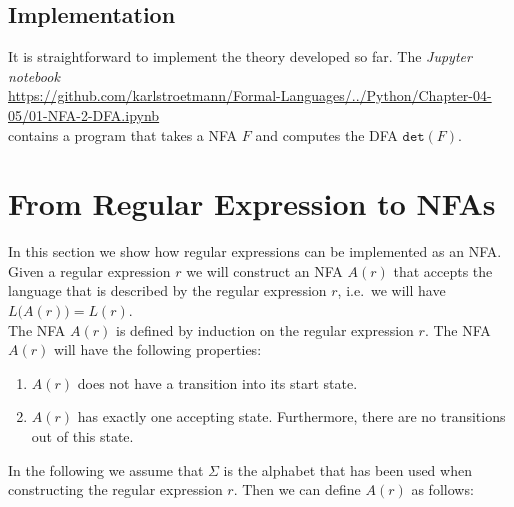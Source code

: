 \subsection{Implementation}
It is straightforward to implement the theory developed so far. 
The \textsl{Jupyter notebook} 
\\[0.2cm]
\hspace*{0.0cm}
\href{https://github.com/karlstroetmann/Formal-Languages/blob/master/Python/Chapter-04-05/01-NFA-2-DFA.ipynb}{https://github.com/karlstroetmann/Formal-Languages/../Python/Chapter-04-05/01-NFA-2-DFA.ipynb}
\\[0.2cm]
contains a program that takes a \textsc{NFA} $F$ and computes the \textsc{DFA} $\mathtt{det}(F)$.


\section{From Regular Expression to NFAs}
In this section we show how regular expressions can be implemented as an \textsc{NFA}.
Given a regular expression $r$ we will construct an \textsc{NFA} $A(r)$ that accepts the
language that is described by the regular expression $r$, i.e.~we will have
\\[0.2cm]
\hspace*{1.3cm}
$L\bigl(A(r)\bigr) = L(r)$.
\\[0.2cm]
The \textsc{NFA} $A(r)$ is defined by induction on the regular expression $r$.  The \textsc{NFA} $A(r)$ will
have the following properties:
\begin{enumerate}
\item $A(r)$ does not have a transition into its start state.  
\item $A(r)$ has exactly one accepting state.  
      Furthermore, there are no transitions out of this state.
\end{enumerate}
In the following we assume that $\Sigma$ is the alphabet that has been used when constructing the regular
expression $r$.  Then we can define $A(r)$ as follows:
